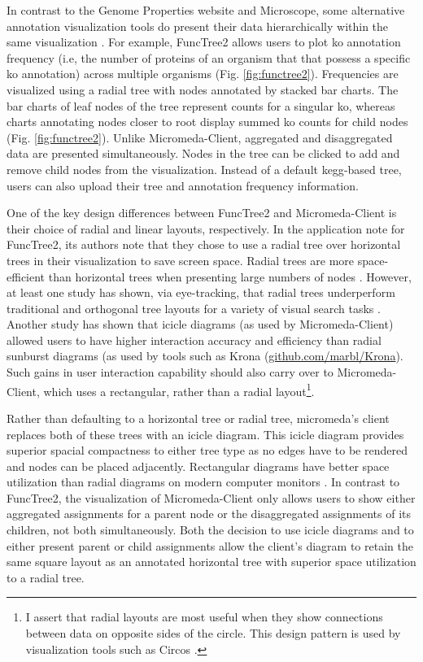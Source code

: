 In contrast to the Genome Properties website and Microscope, some alternative 
annotation visualization tools do present their data hierarchically within the 
same visualization \cite{darzi2019functree2}. For example, FuncTree2 
\cite{darzi2019functree2} allows users to plot \gls{ko} annotation 
\cite{mao2005automated,kanehisa2011kegg} frequency (i.e, the number of proteins 
of an organism that that possess a specific \gls{ko} annotation) across 
multiple organisms (Fig. \ref{fig:functree2}). Frequencies are visualized using 
a radial tree with nodes annotated by stacked bar charts. The bar charts of leaf 
nodes of the tree represent counts for a singular \gls{ko}, whereas charts 
annotating nodes closer to root display summed \gls{ko} counts for child nodes 
(Fig. \ref{fig:functree2}). Unlike Micromeda-Client, aggregated and 
disaggregated data are presented simultaneously. Nodes in the tree can be clicked 
to add and remove child nodes from the visualization. Instead of a default 
\gls{kegg}-based tree, users can also upload their tree and annotation frequency 
information.

One of the key design differences between FuncTree2 and Micromeda-Client is 
their choice of radial and linear layouts, respectively. In the application note 
for FuncTree2, its authors note that they chose to use a radial tree over 
horizontal trees in their visualization to save screen space. Radial trees are 
more space-efficient than horizontal trees when presenting large numbers of 
nodes \cite{burch2011evaluation}. However, at least one study has shown, via 
eye-tracking, that radial trees underperform traditional and orthogonal tree 
layouts for a variety of visual search tasks \cite{burch2011evaluation}. Another 
study has shown that icicle diagrams (as used by Micromeda-Client) allowed users 
to have higher interaction accuracy and efficiency \cite{muramalla2017radial} 
than radial sunburst diagrams (as used by tools such as Krona 
\cite{ondov2011interactive} 
(\href{http://github.com/marbl/Krona}{github.com/marbl/Krona}).
Such gains in user interaction capability should also carry over to 
Micromeda-Client, which uses a rectangular, rather than a radial 
layout\footnote{I assert that radial layouts are most useful when they show 
connections between data on opposite sides of the circle. This design pattern is 
used by visualization tools such as Circos \cite{krzywinski2009circos}.}.

Rather than defaulting to a horizontal tree or radial tree, micromeda's client 
replaces both of these trees with an icicle diagram. This icicle diagram 
provides superior spacial compactness to either tree type as no edges have to be 
rendered and nodes can be placed adjacently. Rectangular diagrams have better 
space utilization than radial diagrams on modern computer monitors 
\cite{muramalla2017radial}. In contrast to FuncTree2, the visualization of 
Micromeda-Client only allows users to show either aggregated assignments for a 
parent node or the disaggregated assignments of its children, not both 
simultaneously. Both the decision to use icicle diagrams and to either present 
parent or child assignments allow the client's diagram to retain the same square 
layout as an annotated horizontal tree with superior space utilization to a 
radial tree. 

